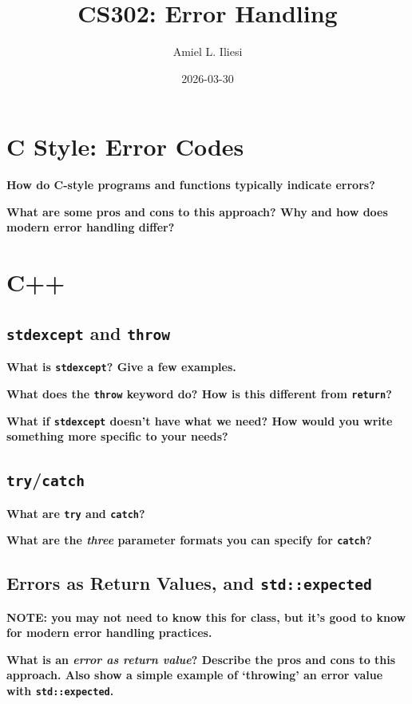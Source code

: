 \documentclass[12pt, letterpaper]{article}
\title{CS302: Error Handling}
\author{Amiel L. Iliesi}
\date{2026-03-30}
\newcommand{\question}[2][4em]{\textbf{#2}\vspace{#1}\par}
\begin{document}
\maketitle

\tableofcontents

\pagebreak
\section{C Style: Error Codes}

\question{How do C-style programs and functions typically indicate errors?}

\question{What are some pros and cons to this approach? Why and how does modern
error handling differ?}

\pagebreak
\section{C++}

\subsection{\texttt{stdexcept} and \texttt{throw}}

\question{What is \texttt{stdexcept}? Give a few examples.}

\question{What does the \texttt{throw} keyword do? How is this different from
\texttt{return}?}

\question{What if \texttt{stdexcept} doesn't have what we need? How would you
write something more specific to your needs?}

\subsection{\texttt{try}/\texttt{catch}}

\question{What are \texttt{try} and \texttt{catch}?}

\question{What are the \emph{three} parameter formats you can specify for
\texttt{catch}?}

\subsection{Errors as Return Values, and \texttt{std::expected}}

\textbf{NOTE: you may not need to know this for class, but it's good to know
for modern error handling practices.}

\question{What is an \emph{error as return value}? Describe the pros and cons
to this approach. Also show a simple example of {\lq{throwing}\rq}  an error value with
\texttt{std::expected}.}
\end{document}
